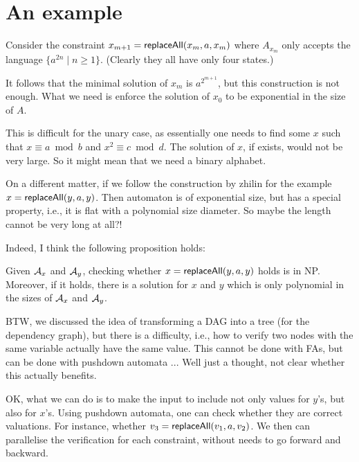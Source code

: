 \documentclass{llncs}
\begin{document}
\appendix

\section{An example}

Consider the constraint $x_{m+1}=\mathsf{replaceAll}(x_m,a,x_m)$ where $A_{x_m}$ only accepts the language $\{a^{2n}\mid n\geq 1\}$. (Clearly they all have only four states.)

It follows that the minimal solution of $x_m$ is $a^{2^{m+1}}$, but this construction is not enough. What we need is enforce the solution of $x_0$ to be exponential in the size of $A$. 

This is difficult for the unary case, as essentially one needs to find some $x$ such that $x\equiv a \bmod b$ and $x^2 \equiv c\bmod d$. The solution of $x$, if exists, would not be very large. So it might mean that we need a binary alphabet. 

On a different matter, if we follow the construction by zhilin for the example $x=\mathsf{replaceAll}(y,a,y)$. Then automaton is of exponential size, but has a special property, i.e., it is flat with a polynomial size diameter. So maybe the length cannot be very long at all?!

Indeed, I think the following proposition holds:
\begin{proposition}
	Given $\mathcal{A}_x$ and $\mathcal{A}_y$, checking whether $x=\mathsf{replaceAll}(y,a,y)$ holds is in NP. Moreover, if it holds, there is a solution for $x$ and $y$ which is only polynomial in the sizes of $\mathcal{A}_x$ and $\mathcal{A}_y$. 
\end{proposition}	

BTW, we discussed the idea of transforming a DAG into a tree (for the dependency graph), but there is a difficulty, i.e., how to verify two nodes with the same variable actually have the same value. This cannot be done with FAs, but can be done with pushdown automata ... Well just a thought, not clear whether this actually benefits. 

OK, what we can do is to make the input to include not only values for $y$'s, but also for $x$'s. Using pushdown automata, one can check whether they are correct valuations. For instance, whether $v_3=\mathsf{replaceAll}(v_1, a,v_2)$. We then can parallelise the verification for each constraint, without needs to go forward and backward.  
 


\end{document}
